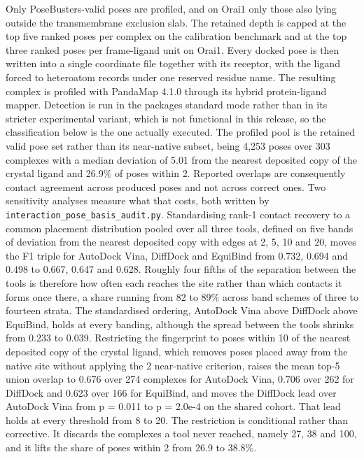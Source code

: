 Only PoseBusters-valid poses are profiled, and on Orai1 only those also lying outside the transmembrane exclusion slab. The retained depth is capped at the top five ranked poses per complex on the calibration benchmark and at the top three ranked poses per frame-ligand unit on Orai1. Every docked pose is then written into a single coordinate file together with its receptor, with the ligand forced to heteroatom records under one reserved residue name. The resulting complex is profiled with PandaMap 4.1.0 \cite{ref090} through its hybrid protein-ligand mapper. Detection is run in the package\textquotesingle s standard mode rather than in its stricter experimental variant, which is not functional in this release, so the classification below is the one actually executed. The profiled pool is the retained valid pose set rather than its near-native subset, being 4,253 poses over 303 complexes with a median deviation of 5.01\angstrom{} from the nearest deposited copy of the crystal ligand and 26.9\% of poses within 2\angstrom{}. Reported overlaps are consequently contact agreement across produced poses and not across correct ones. Two sensitivity analyses measure what that costs, both written by \texttt{interaction\_pose\_basis\_audit.py}. Standardising rank-1 contact recovery to a common placement distribution pooled over all three tools, defined on five bands of deviation from the nearest deposited copy with edges at 2, 5, 10 and 20\angstrom{}, moves the F1 triple for AutoDock Vina, DiffDock and EquiBind from 0.732, 0.694 and 0.498 to 0.667, 0.647 and 0.628. Roughly four fifths of the separation between the tools is therefore how often each reaches the site rather than which contacts it forms once there, a share running from 82 to 89\% across band schemes of three to fourteen strata. The standardised ordering, AutoDock Vina above DiffDock above EquiBind, holds at every banding, although the spread between the tools shrinks from 0.233 to 0.039. Restricting the fingerprint to poses within 10\angstrom{} of the nearest deposited copy of the crystal ligand, which removes poses placed away from the native site without applying the 2\angstrom{} near-native criterion, raises the mean top-5 union overlap to 0.676 over 274 complexes for AutoDock Vina, 0.706 over 262 for DiffDock and 0.623 over 166 for EquiBind, and moves the DiffDock lead over AutoDock Vina from p = 0.011 to p = 2.0e-4 on the shared cohort. That lead holds at every threshold from 8 to 20\angstrom{}. The restriction is conditional rather than corrective. It discards the complexes a tool never reached, namely 27, 38 and 100, and it lifts the share of poses within 2\angstrom{} from 26.9 to 38.8\%.

